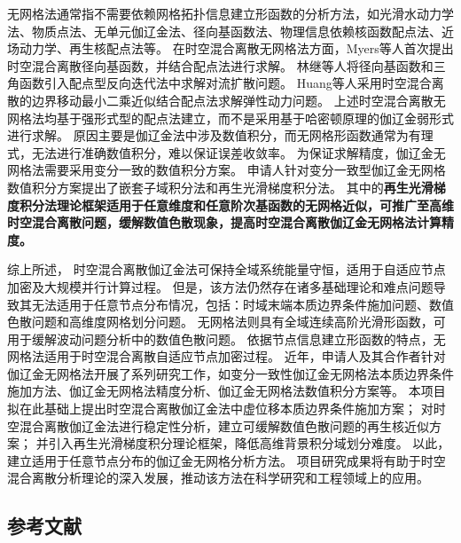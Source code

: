 无网格法通常指不需要依赖网格拓扑信息建立形函数的分析方法，如光滑水动力学法\cite{Yang2019,Chang2011}、物质点法\cite{Kan2022}、无单元伽辽金法\cite{Wu2016d,Cheng2024}、径向基函数法\cite{jiang2025}、物理信息依赖核函数配点法\cite{FuZhuoJia2022}、近场动力学\cite{Gu2016,Zhang2022}、再生核配点法\cite{Hu2023}等。
在时空混合离散无网格法方面，Myers等人\cite{myers2002}首次提出时空混合离散径向基函数，并结合配点法进行求解。
林继等人\cite{lin2021}将径向基函数和三角函数引入配点型反向迭代法中求解对流扩散问题。
Huang等人\cite{huang2024}采用时空混合离散的边界移动最小二乘近似结合配点法求解弹性动力问题。
上述时空混合离散无网格法均基于强形式型的配点法建立，而不是采用基于哈密顿原理的伽辽金弱形式进行求解。
原因主要是伽辽金法中涉及数值积分，而无网格形函数通常为有理式，无法进行准确数值积分，难以保证误差收敛率\cite{wu2021}。
为保证求解精度，伽辽金无网格法需要采用变分一致的数值积分方案\cite{Wu2016d}。
申请人针对变分一致型伽辽金无网格数值积分方案提出了嵌套子域积分法\cite{wang2016b}和再生光滑梯度积分法\cite{wang2019a}。
其中的\textbf{再生光滑梯度积分法理论框架适用于任意维度和任意阶次基函数的无网格近似，可推广至高维时空混合离散问题，缓解数值色散现象，提高时空混合离散伽辽金无网格法计算精度。}

综上所述，
时空混合离散伽辽金法可保持全域系统能量守恒，适用于自适应节点加密及大规模并行计算过程。
但是，该方法仍然存在诸多基础理论和难点问题导致其无法适用于任意节点分布情况，包括：时域末端本质边界条件施加问题、数值色散问题和高维度网格划分问题。
无网格法则具有全域连续高阶光滑形函数，可用于缓解波动问题分析中的数值色散问题。
依据节点信息建立形函数的特点，无网格法适用于时空混合离散自适应节点加密过程。
近年，申请人及其合作者针对伽辽金无网格法开展了系列研究工作，如变分一致性伽辽金无网格法本质边界条件施加方法\cite{Wu2022b,wu2023,wu2024}、伽辽金无网格法精度分析\cite{wu2021,wu2018a}、伽辽金无网格法数值积分方案\cite{Wu2016d,wang2016b,wang2019a}等。
本项目拟在此基础上提出时空混合离散伽辽金法中虚位移本质边界条件施加方案；
对时空混合离散伽辽金法进行稳定性分析，建立可缓解数值色散问题的再生核近似方案；
并引入再生光滑梯度积分理论框架，降低高维背景积分域划分难度。
以此，建立适用于任意节点分布的伽辽金无网格分析方法。
项目研究成果将有助于时空混合离散分析理论的深入发展，推动该方法在科学研究和工程领域上的应用。


\begin{REF}
	\subsection*{参考文献}
	\vspace{-50pt}
	
\end{REF}

